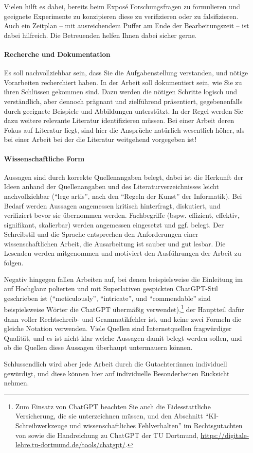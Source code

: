 Vielen hilft es dabei, bereits beim Exposé Forschungsfragen zu formulieren und geeignete Experimente zu
konzipieren diese zu verifizieren oder zu falsifizieren. Auch ein Zeitplan -- mit ausreichendem Puffer
am Ende der Bearbeitungszeit -- ist dabei hilfreich.
Die Betreuenden helfen Ihnen dabei sicher gerne.

\paragraph*{Recherche und Dokumentation}
Es soll nachvollziehbar sein, dass Sie die Aufgabenstellung verstanden, und nötige Vorarbeiten recherchiert haben.
In der Arbeit soll dokumentiert sein, wie Sie zu ihren Schlüssen gekommen sind. Dazu werden die nötigen
Schritte logisch und verständlich, aber dennoch prägnant und zielführend präsentiert, gegebenenfalls durch
geeignete Beispiele und Abbildungen unterstützt.
In der Regel werden Sie dazu weitere relevante Literatur identifizieren müssen.
Bei einer Arbeit deren Fokus auf Literatur liegt, sind hier die Ansprüche natürlich wesentlich höher,
als bei einer Arbeit bei der die Literatur weitgehend vorgegeben ist!

\paragraph*{Wissenschaftliche Form}
Aussagen sind durch korrekte Quellenangaben belegt, dabei ist die Herkunft der Ideen anhand der Quellenangaben
und des Literaturverzeichnisses leicht nachvollziehbar (\enquote{lege artis}, nach den \enquote{Regeln der Kunst} der Informatik).
Bei Bedarf werden Aussagen angemessen kritisch hinterfragt, diskutiert, und verifiziert bevor sie übernommen werden.
Fachbegriffe (bspw.{} effizient, effektiv, signifikant, skalierbar) werden angemessen eingesetzt und ggf.{} belegt. 
Der Schreibstil und die Sprache entsprechen den Anforderungen einer wissenschaftlichen Arbeit, die Ausarbeitung ist sauber und gut lesbar.
Die Lesenden werden mitgenommen und motiviert den Ausführungen der Arbeit zu folgen.

Negativ hingegen fallen Arbeiten auf, bei denen beispielsweise die Einleitung
im auf Hochglanz polierten und mit Superlativen gespickten ChatGPT-Stil geschrieben ist (\enquote{meticulously}, \enquote{intricate}, und \enquote{commendable} sind beispielsweise Wörter die ChatGPT übermäßig verwendet),\footnote{Zum Einsatz von ChatGPT beachten Sie auch die Eidesstattliche Versicherung, die sie unterzeichnen müssen, und den Abschnitt \enquote{KI-Schreibwerkzeuge und wissenschaftliches Fehlverhalten} im Rechtsgutachten von \textcite{10.13154/294-9734} sowie die Handreichung zu ChatGPT der TU Dortmund, \url{https://digitale-lehre.tu-dortmund.de/tools/chatgpt/}.}
der Hauptteil dafür dann voller Rechtschreib- und Grammatikfehler ist, und keine zwei Formeln die gleiche Notation verwenden.
Viele Quellen sind Internetquellen fragwürdiger Qualität, und es ist nicht klar welche Aussagen damit belegt werden sollen,
und ob die Quellen diese Aussagen überhaupt untermauern können.

\medskip
Schlussendlich wird aber jede Arbeit durch die Gutachter:innen individuell gewürdigt, und diese können hier auf individuelle Besonderheiten Rücksicht nehmen.